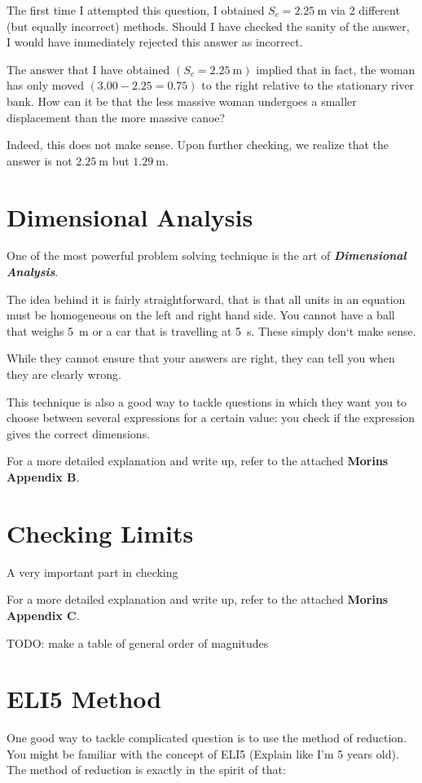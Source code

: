 \documentclass[11pt]{article}
\begin{document}
	The first time I attempted this question, I obtained $S_c = \SI{2.25}{\meter}$ via 2 different (but equally incorrect) methods. Should I have checked the sanity of the answer, I would have immediately rejected this answer as incorrect. 
	
	The answer that I have obtained $(S_c = \SI{2.25}{\meter})$ implied that in fact, the woman has only moved $(3.00 - 2.25 = 0.75)$ to the right relative to the stationary river bank. How can it be that the less massive woman undergoes a smaller displacement than the more massive canoe?
	
	Indeed, this does not make sense. Upon further checking, we realize that the answer is not $\SI{2.25}{\meter}$ but $\SI{1.29}{\meter}$.

	
	\section{Dimensional Analysis}
	One of the most powerful problem solving technique is the art of \textbf{\textit{Dimensional Analysis}}. 
	
	The idea behind it is fairly straightforward, that is that all units in an equation must be homogeneous on the left and right hand side. You cannot have a ball that weighs \SI{5}{\meter} or a car that is travelling at \SI{5}{\second}. These simply don`t make sense. 
	
	While they cannot ensure that your answers are right, they can tell you when they are clearly wrong. 
	
	This technique is also a good way to tackle questions in which they want you to choose between several expressions for a certain value: you check if the expression gives the correct dimensions. 
	
	For a more detailed explanation and write up, refer to the attached \textbf{Morins Appendix B}.
	
	\section{Checking Limits}
	A very important part in checking 
	
	For a more detailed explanation and write up, refer to the attached\textbf{ Morins Appendix C}.
	
	TODO: make a table of general order of magnitudes
	\section{ELI5 Method}
	One good way to tackle complicated question is to use the method of reduction. You might be familiar with the concept of ELI5 (Explain like I'm 5 years old). The method of reduction is exactly in the spirit of that:
	
\end{document}
